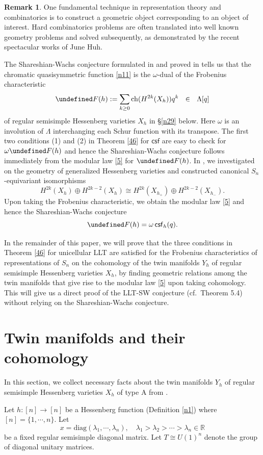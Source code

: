 \documentclass[11pt]{article}
\theoremstyle{definition}
\newtheorem{remark}[theo]{Remark}
\numberwithin{equation}{section}
\let\cal\undefined
\numberwithin{equation}{section}
\newcommand\RR{\mathbb{R}}
\newcommand{\cal}{\mathcal}
\newcommand\cF{{\cal F}}
\newcommand\ch{\mathrm{ch} }
\newcommand\csf{\mathsf{csf}}
\begin{document}
\begin{remark}
One fundamental technique in representation theory and combinatorics is to 
construct a geometric object corresponding to an object of interest. 
Hard combinatorics problems are often translated into well known geometry problems and solved subsequently, as demonstrated by the recent spectacular works of June Huh.   


The Shareshian-Wachs conjecture  formulated in \cite{SW} and proved in \cite{BC, GP2}  tells us 
that the chromatic quasisymmetric function \eqref{n11} is the $\omega$-dual of the Frobenius characteristic 
$$\cF(h):=\sum_{k\ge 0} \ch (H^{2k}(X_h)) q^k \ \ \in \ \  \Lambda[q]$$ 
of regular semisimple Hessenberg varieties $X_h$ in \S\ref{n29} below. Here $\omega$ is an involution of $\Lambda$ interchanging each Schur function with its transpose.  
The first two conditions (1) and (2) in Theorem \ref{46} for $\csf$ are easy to check for $\omega \cF(h)$ and hence the Shareshian-Wachs conjecture follows immediately from the modular law \eqref{5} for $\cF(h)$. 
In \cite{KL}, we investigated on the geometry of generalized Hessenberg varieties and constructed canonical $S_n$-equivariant isomorphisms
$$H^{2k}(X_h)\oplus H^{2k-2}(X_h)\cong H^{2k}(X_{h_+})\oplus H^{2k-2}(X_{h_-}).$$
Upon taking the Frobenius characteristic, we obtain the modular law \eqref{5} and hence the Shareshian-Wachs conjecture $$\cF(h)=\omega\, \csf_h(q).$$ 

In the remainder of this paper, we will prove that the three conditions in Theorem \ref{46} for unicellular LLT are satisfied for the Frobenius characteristics of representations of $S_n$ on the cohomology of the twin manifolds $Y_h$ of regular semisimple Hessenberg varieties $X_h$, by finding geometric relations among the twin manifolds that give rise to the modular law \eqref{5} upon taking cohomology. This will give us a direct proof of the LLT-SW conjecture (cf.~Theorem 5.4) without relying on the Shareshian-Wachs conjecture.
\end{remark}

\section{Twin manifolds and their cohomology}\label{14}
In this section, we collect necessary facts about the twin manifolds $Y_h$ of regular semisimple Hessenberg varieties $X_h$ of type A 
from \cite{AB}.

Let $h:[n]\to [n]$ be a Hessenberg function (Definition \ref{n1}) where $[n]=\{1,\cdots, n\}$. 
Let $$x=\mathrm{diag}(\lambda_1,\cdots,\lambda_n),\quad
\lambda_1 >\lambda_2 >\cdots > \lambda_n \in \RR$$
be a fixed regular semisimple diagonal matrix. 
Let $T\cong U(1)^n$ denote the group of diagonal unitary matrices.
\end{document}
